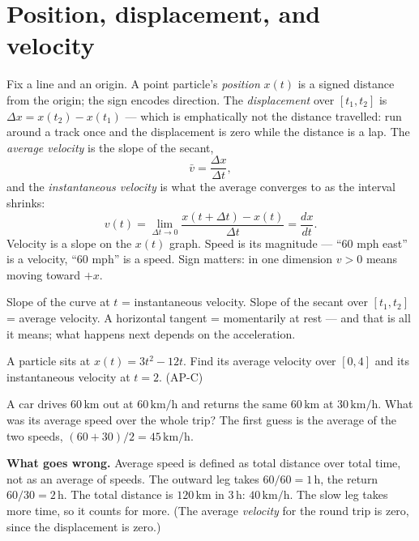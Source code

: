 \section{Position, displacement, and velocity}\label{sec:kin-pos}

Fix a line and an origin. A point particle's \emph{position}
$x(t)$ is a signed distance from the origin; the sign encodes direction. The
\emph{displacement} over $[t_1,t_2]$ is
$\Delta x=x(t_2)-x(t_1)$ --- which is emphatically not the distance travelled:
run around a track once and the displacement is zero while the distance is a
lap. The \emph{average velocity} is the slope of the
secant,
\[
  \bar v=\frac{\Delta x}{\Delta t},
\]
and the \emph{instantaneous velocity} is what the average converges to as the
interval shrinks:
\[
  v(t)=\lim_{\Delta t\to0}\frac{x(t+\Delta t)-x(t)}{\Delta t}
      =\frac{dx}{dt}.
\]
Velocity is a slope on the $x(t)$ graph. Speed is its magnitude --- ``60 mph
east'' is a velocity, ``60 mph'' is a speed. Sign matters: in one dimension
$v>0$ means moving toward $+x$.

\begin{rulebox}
Slope of the curve at $t$ = instantaneous velocity. Slope of the secant over
$[t_1,t_2]$ = average velocity. A horizontal tangent = momentarily at rest ---
and that is all it means; what happens next depends on the acceleration.
\end{rulebox}

\begin{exercise}[easy]
A particle sits at $x(t)=3t^{2}-12t$. Find its average velocity over
$[0,4]$ and its instantaneous velocity at $t=2$. (AP-C)
\end{exercise}

\begin{example}\label{ex:naive-avg-speed}
A car drives $60\,\mathrm{km}$ out at $60\,\mathrm{km/h}$ and returns the same $60\,\mathrm{km}$ at
$30\,\mathrm{km/h}$. What was its average speed over the whole trip? The first guess is the average of the
two speeds, $(60+30)/2=45\,\mathrm{km/h}$.
\par\smallskip
\textbf{What goes wrong.} Average speed is defined as total distance over total time, not as an average of
speeds. The outward leg takes $60/60=1\,\mathrm{h}$, the return $60/30=2\,\mathrm{h}$. The total distance is
$120\,\mathrm{km}$ in $3\,\mathrm{h}$: $40\,\mathrm{km/h}$. The slow leg takes more time, so it counts for more.
(The average \emph{velocity} for the round trip is zero, since the displacement is zero.)
\end{example}

